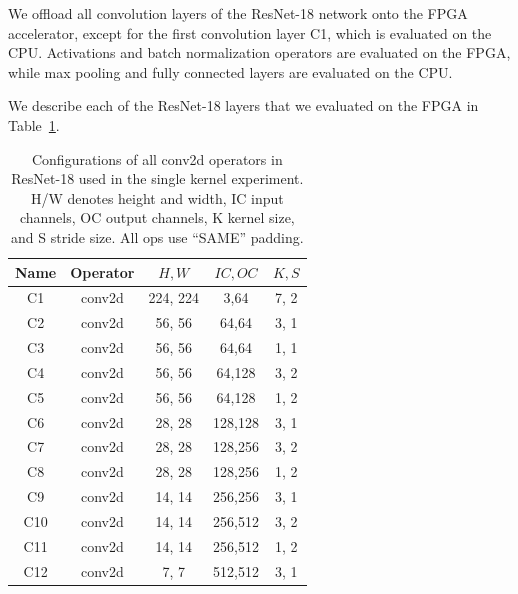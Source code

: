 \documentclass[sigconf]{acmart}
\begin{document}
We offload all convolution layers of the ResNet-18 network onto the FPGA accelerator, except for the first convolution layer C1, which is evaluated on the CPU.
Activations and batch normalization operators are evaluated on the FPGA, while max pooling and fully connected layers are evaluated on the CPU.

We describe each of the ResNet-18 layers that we evaluated on the FPGA in Table~\ref{table:resnet18}.

\begin{table}[t]
  \begin{footnotesize}
	\begin{tabular}{ccccc}
	\hline
	Name & Operator & $H, W$ & $IC, OC$ & $K, S$ \\
	\hline
	C1  & conv2d & 224, 224 & 3,64  & 7, 2 \\
	C2  & conv2d & 56, 56 & 64,64   & 3, 1 \\
	C3  & conv2d & 56, 56 & 64,64   & 1, 1 \\
	C4  & conv2d & 56, 56 & 64,128  & 3, 2 \\
	C5  & conv2d & 56, 56 & 64,128  & 1, 2 \\
	C6  & conv2d & 28, 28 & 128,128 & 3, 1 \\
	C7  & conv2d & 28, 28 & 128,256 & 3, 2 \\
	C8  & conv2d & 28, 28 & 128,256 & 1, 2 \\
	C9  & conv2d & 14, 14 & 256,256 & 3, 1 \\
	C10 & conv2d & 14, 14 & 256,512 & 3, 2 \\
	C11 & conv2d & 14, 14 & 256,512 & 1, 2 \\
	C12 & conv2d &  7,  7 & 512,512 & 3, 1 \\
	\hline
	\end{tabular}
  \end{footnotesize}
	\centering
	\caption{\small{Configurations of all conv2d operators in ResNet-18 used in the single kernel experiment.
	H/W denotes height and width, IC input channels, OC output channels,
	K kernel size, and S stride size. All ops use ``SAME'' padding.}}
	\label{table:resnet18}
\end{table}
\end{document}
